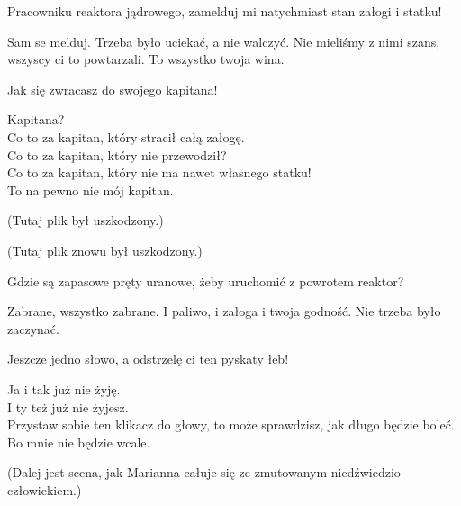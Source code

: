 \begin{poem}
	
	\charkap{}
	Pracowniku reaktora jądrowego, zamelduj mi natychmiast stan załogi i statku!
	
	\charkos{}
	Sam se melduj. Trzeba było uciekać, a nie walczyć.
	Nie mieliśmy z nimi szans, wszyscy ci to powtarzali.
	To wszystko twoja wina.
	
	\charkap{}
	Jak się zwracasz do swojego kapitana!
	
	\charkos{}
	Kapitana? \\
	Co to za kapitan, który stracił całą załogę. \\
	Co to za kapitan, który nie przewodził? \\
	Co to za kapitan, który nie ma nawet własnego statku! \\
	To na pewno nie mój kapitan.
\end{poem}
	(Tutaj plik był uszkodzony.)
\begin{poem}
\end{poem}
	(Tutaj plik znowu był uszkodzony.)
\begin{poem}
	Gdzie są zapasowe pręty uranowe, żeby uruchomić z powrotem reaktor?
	
	\charkos{}
	Zabrane, wszystko zabrane.
	I paliwo, i załoga i twoja godność.
	Nie trzeba było zaczynać.
	
	\charkap{}
	Jeszcze jedno słowo, a odstrzelę ci ten pyskaty łeb!
	
	\charkos{}
	Ja i tak już nie żyję. \\
	I ty też już nie żyjesz. \\
	Przystaw sobie ten klikacz do głowy, to może sprawdzisz, jak długo będzie boleć. \\
	Bo mnie nie będzie wcale.
	
	
	(Dalej jest scena, jak Marianna całuje się ze zmutowanym niedźwiedzio-człowiekiem.)
\end{poem}

